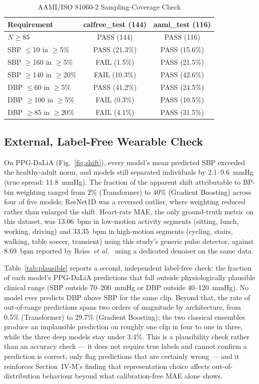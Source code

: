 \documentclass[journal]{IEEEtran}
\begin{document}
\begin{table}[!t]
\caption{AAMI/ISO 81060-2 Sampling-Coverage Check}
\label{tab:aami}
\centering
\footnotesize
\begin{tabular}{lcc}
\toprule
Requirement & calfree\_test (144) & aami\_test (116) \\
\midrule
$N \geq 85$ & PASS (144) & PASS (116) \\
SBP $\leq$10 in $\geq$5\% & PASS (21.3\%) & PASS (15.6\%) \\
SBP $\geq$160 in $\geq$5\% & FAIL (1.5\%) & PASS (21.5\%) \\
SBP $\geq$140 in $\geq$20\% & FAIL (10.3\%) & PASS (42.6\%) \\
DBP $\leq$60 in $\geq$5\% & PASS (41.2\%) & PASS (24.5\%) \\
DBP $\geq$100 in $\geq$5\% & FAIL (0.3\%) & PASS (10.5\%) \\
DBP $\geq$85 in $\geq$20\% & FAIL (4.1\%) & PASS (31.5\%) \\
\bottomrule
\end{tabular}
\end{table}

\subsection{External, Label-Free Wearable Check}
On PPG-DaLiA (Fig.~\ref{fig:shift}), every model's mean predicted SBP exceeded the healthy-adult norm, and models still separated individuals by 2.1--9.6~mmHg (true spread: 11.8~mmHg). The fraction of the apparent shift attributable to BP-bin weighting ranged from 2\% (Transformer) to 40\% (Gradient Boosting) across four of five models; ResNet1D was a reversed outlier, where weighting reduced rather than enlarged the shift. Heart-rate MAE, the only ground-truth metric on this dataset, was 13.06~bpm in low-motion activity segments (sitting, lunch, working, driving) and 33.35~bpm in high-motion segments (cycling, stairs, walking, table soccer, transient) using this study's generic pulse detector, against 8.69~bpm reported by Reiss~\textit{et al.}~\cite{reiss2019} using a dedicated denoiser on the same data.

Table~\ref{tab:plausible} reports a second, independent label-free check: the fraction of each model's PPG-DaLiA predictions that fall outside physiologically plausible clinical range (SBP outside 70--200~mmHg or DBP outside 40--120~mmHg). No model ever predicts DBP above SBP for the same clip. Beyond that, the rate of out-of-range predictions spans two orders of magnitude by architecture, from 0.5\% (Transformer) to 29.7\% (Gradient Boosting); the two classical ensembles produce an implausible prediction on roughly one clip in four to one in three, while the three deep models stay under 3.4\%. This is a plausibility check rather than an accuracy check --- it does not require true labels and cannot confirm a prediction is correct, only flag predictions that are certainly wrong --- and it reinforces Section~IV-M's finding that representation choice affects out-of-distribution behaviour beyond what calibration-free MAE alone shows.
\end{document}
